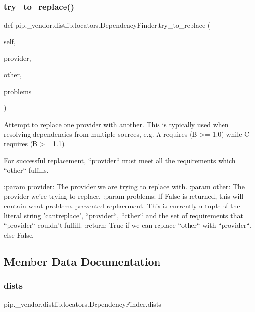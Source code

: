 \subsubsection{\texorpdfstring{try\+\_\+to\+\_\+replace()}{try\_to\_replace()}}
{\footnotesize\ttfamily def pip.\+\_\+vendor.\+distlib.\+locators.\+Dependency\+Finder.\+try\+\_\+to\+\_\+replace (\begin{DoxyParamCaption}\item[{}]{self,  }\item[{}]{provider,  }\item[{}]{other,  }\item[{}]{problems }\end{DoxyParamCaption})}

\begin{DoxyVerb}Attempt to replace one provider with another. This is typically used
when resolving dependencies from multiple sources, e.g. A requires
(B >= 1.0) while C requires (B >= 1.1).

For successful replacement, ``provider`` must meet all the requirements
which ``other`` fulfills.

:param provider: The provider we are trying to replace with.
:param other: The provider we're trying to replace.
:param problems: If False is returned, this will contain what
         problems prevented replacement. This is currently
         a tuple of the literal string 'cantreplace',
         ``provider``, ``other``  and the set of requirements
         that ``provider`` couldn't fulfill.
:return: True if we can replace ``other`` with ``provider``, else
 False.
\end{DoxyVerb}
 

\subsection{Member Data Documentation}
\mbox{\label{classpip_1_1__vendor_1_1distlib_1_1locators_1_1DependencyFinder_a6f9eef84e7877dae26151fdecc1b0c38}} 
\subsubsection{\texorpdfstring{dists}{dists}}
{\footnotesize\ttfamily pip.\+\_\+vendor.\+distlib.\+locators.\+Dependency\+Finder.\+dists}

